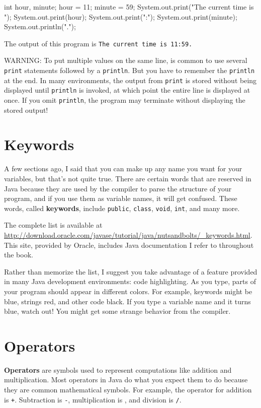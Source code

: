 \begin{code}
    int hour, minute;
    hour = 11;
    minute = 59;
    System.out.print("The current time is ");
    System.out.print(hour);
    System.out.print(":");
    System.out.print(minute);
    System.out.println(".");
\end{code}
%
The output of this program is {\tt The current time is 11:59.}

WARNING: To put multiple values
on the same line, is common to use several {\tt print} statements
followed by a {\tt println}.
But you have to remember
the {\tt println} at the end.  In many environments, the
output from {\tt print} is stored without being displayed until
{\tt println} is invoked, at which point the entire
line is displayed at once.  If you omit {\tt println}, the
program may terminate without displaying the stored output!


\section{Keywords}

A few sections ago, I said that you can make up any name you
want for your variables, but that's not quite true.  There
are certain words that are reserved in Java because they are
used by the compiler to parse the structure of your program,
and if you use them as variable names, it will get confused.
These words, called {\bf keywords}, include {\tt public},
{\tt class}, {\tt void}, {\tt int}, and many more.

The complete list is available at \url{http://download.oracle.com/javase/tutorial/java/nutsandbolts/_keywords.html}.
This site, provided by Oracle, includes Java documentation I refer to
throughout the book.

Rather than memorize the list, I suggest you
take advantage of a feature provided in many Java development
environments: code highlighting.  As you type,
parts of your program should appear in different colors.  For
example, keywords might be blue, strings red, and other code
black.  If you type a variable name and it turns blue, watch
out!  You might get some strange behavior from the compiler.


\section{Operators}

{\bf Operators} are symbols used to represent
computations like addition and multiplication.  Most
operators in Java do what you expect them
to do because they are common mathematical symbols.  For
example, the operator for addition is {\tt +}.  Subtraction
is {\tt -}, multiplication is {\tt *}, and division is {\tt /}.

